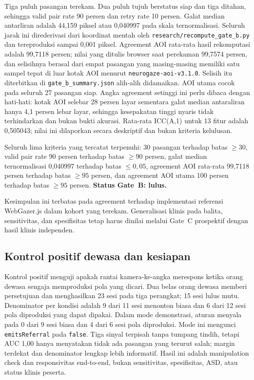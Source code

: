 \documentclass{article}
\begin{document}
Tiga puluh pasangan terekam. Dua puluh tujuh berstatus siap dan tiga ditahan, sehingga valid
pair rate 90 persen dan retry rate 10 persen. Galat median antarliran adalah 44,159 piksel
atau 0,040997 pada skala ternormalisasi. Seluruh jarak ini direderivasi dari koordinat mentah
oleh \texttt{research/recompute\_gate\_b.py} dan tereproduksi sampai 0,001 piksel. Agreement AOI
rata-rata hasil rekomputasi adalah 99,7118 persen; nilai yang ditulis browser saat perekaman
99,7574 persen, dan selisihnya berasal dari empat pasangan yang masing-masing memiliki satu
sampel tepat di luar kotak AOI menurut \texttt{neurogaze-aoi-v3.1.0}. Selisih itu diterbitkan di
\texttt{gate\_b\_summary.json} alih-alih didamaikan. AOI utama cocok pada seluruh 27 pasangan siap.
Angka agreement setinggi ini perlu dibaca dengan hati-hati: kotak AOI selebar 28 persen layar
sementara galat median antaraliran hanya 4,1 persen lebar layar, sehingga kesepakatan tinggi
nyaris tidak terhindarkan dan bukan bukti akurasi. Rata-rata ICC(A,1) untuk 13 fitur adalah
0,505043; nilai ini dilaporkan secara deskriptif dan bukan kriteria kelulusan.

Seluruh lima kriteria yang tercatat terpenuhi: 30 pasangan terhadap batas $\geq 30$, valid
pair rate 90 persen terhadap batas $\geq 90$ persen, galat median ternormalisasi 0,040997
terhadap batas $\leq 0,05$, agreement AOI rata-rata 99,7118 persen terhadap batas $\geq 95$
persen, dan agreement AOI utama 100 persen terhadap batas $\geq 95$ persen.
\textbf{Status Gate~B: lulus.}

Kesimpulan ini terbatas pada agreement terhadap implementasi referensi WebGazer.js dalam kohort yang terekam.
Generalisasi klinis pada balita, sensitivitas, dan spesifisitas tetap harus dinilai melalui
Gate~C prospektif dengan hasil klinis independen.

\subsection{Kontrol positif dewasa dan kesiapan}

Kontrol positif menguji apakah rantai kamera-ke-angka merespons ketika orang dewasa sengaja
memproduksi pola yang dicari. Dua belas orang dewasa memberi persetujuan dan menghasilkan
23 sesi pada tiga perangkat; 15 sesi lulus mutu. Denominator per kondisi adalah 9 dari 11
sesi menonton biasa dan 6 dari 12 sesi pola diproduksi yang dapat dipakai. Dalam mode
demonstrasi, aturan menyala pada 0 dari 9 sesi biasa dan 4 dari 6 sesi pola diproduksi.
Mode ini mengunci \texttt{emitsReferral} pada \texttt{false}. Tiga sinyal terpisah tanpa
tumpang tindih, tetapi AUC 1,00 hanya menyatakan tidak ada pasangan yang terurut salah;
margin terdekat dan denominator lengkap lebih informatif. Hasil ini adalah manipulation
check dan responsivitas end-to-end, bukan sensitivitas, spesifisitas, ASD, atau status
klinis peserta.
\end{document}
